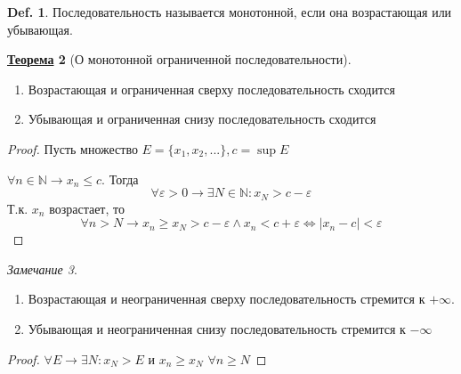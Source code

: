\documentclass[12pt]{article}
\newenvironment{MyList}[1][4pt]{
  \begin{enumerate}[1.]
  \setlength{\parskip}{0pt}
  \setlength{\itemsep}{#1}
}{       
  \end{enumerate}
}
\def\N{\mathbb{N}}       %
\theoremstyle{definition} %
\newtheorem{Thm}{\underline{Теорема}}[subsection] %
\newtheorem{Def}[Thm]{Def.} %
\theoremstyle{remark} %
\newtheorem{Rem}[Thm]{Замечание} %
\begin{document}
\begin{Def}
    Последовательность называется монотонной, если она возрастающая или убывающая.
\end{Def}

\begin{Thm}[О монотонной ограниченной последовательности]
    \begin{MyList}
        \item Возрастающая и ограниченная сверху последовательность сходится
        \item Убывающая и ограниченная снизу последовательность сходится
    \end{MyList}
\end{Thm}

\begin{proof}
    Пусть множество $E = \{x_1, x_2, ...\}, c = \sup E$ 

    $\forall n \in \N \to x_n \leqslant c$. Тогда
    \[\forall \varepsilon > 0 \to \exists N \in \N : x_N > c - \varepsilon\]
    Т.к. $x_n$ возрастает, то \[\forall n > N \to x_n \geqslant x_N > c - \varepsilon \wedge x_n < c + \varepsilon \Leftrightarrow |x_n - c| < \varepsilon\] 
\end{proof}
\begin{Rem}
    \begin{MyList}
        \item Возрастающая и неограниченная сверху последовательность стремится к $+\infty$.
        \item Убывающая и неограниченная снизу последовательность стремится к $-\infty$
    \end{MyList}
    \begin{proof}
        $\forall E \to \exists N : x_N > E$ и $x_n \geqslant x_N$ $\forall n \geqslant N$  
    \end{proof}
\end{Rem}
\end{document}

